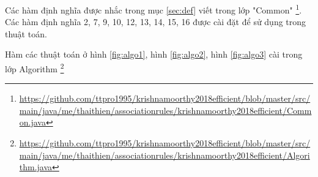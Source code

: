 Các hàm định nghĩa được nhắc trong mục \ref{sec:def} viết trong lớp "Common" \footnote{\url{https://github.com/ttpro1995/krishnamoorthy2018efficient/blob/master/src/main/java/me/thaithien/associationrules/krishnamoorthy2018efficient/Common.java}}. Các hàm định nghĩa 2, 7, 9, 10, 12, 13, 14, 15, 16 được cài đặt để sử dụng trong thuật toán. 

Hàm các thuật toán ở hình \ref{fig:algo1}, hình \ref{fig:algo2}, hình \ref{fig:algo3} cài trong lớp Algorithm \footnote{\url{https://github.com/ttpro1995/krishnamoorthy2018efficient/blob/master/src/main/java/me/thaithien/associationrules/krishnamoorthy2018efficient/Algorithm.java}} 





















